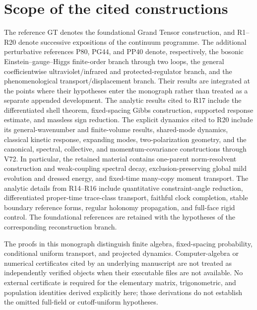\documentclass[11pt,a4paper,oneside]{book}
\theoremstyle{plain}
\theoremstyle{definition}
\theoremstyle{remark}
\begin{document}
\section{Scope of the cited constructions}
The reference GT denotes the foundational Grand Tensor construction, and
R1--R20 denote successive expositions of the continuum programme.  The
additional perturbative references P80, PG44, and PP40 denote, respectively,
the bosonic Einstein--gauge--Higgs finite-order branch through two loops, the
general coefficientwise ultraviolet/infrared and protected-regulator branch,
and the phenomenological transport/displacement branch.  Their results are
integrated at the points where their hypotheses enter the monograph rather
than treated as a separate appended development.  The
analytic results cited to R17 include the differentiated shell theorem,
fixed-spacing Gibbs construction, supported response estimate, and
massless sign reduction.  The explicit dynamics cited to R20 include its
general-wavenumber and finite-volume results, shared-mode dynamics,
classical kinetic response, expanding modes, two-polarization geometry,
and the canonical, spectral, collective, and momentum-covariance
constructions through V72.  In particular, the retained material
contains one-parent norm-resolvent construction and weak-coupling
spectral decay, exclusion-preserving global mild evolution and dressed
energy, and fixed-time many-copy moment transport.  The analytic details
from R14--R16 include quantitative constraint-angle reduction,
differentiated proper-time trace-class transport, faithful clock
completion, stable boundary reference forms, regular holonomy
propagation, and full-face rigid control.  The foundational references are
retained with the hypotheses of the corresponding reconstruction branch.

The proofs in this monograph distinguish finite algebra, fixed-spacing
probability, conditional uniform transport, and projected dynamics.
Computer-algebra or numerical certificates cited by an underlying
manuscript are not treated as independently verified objects when their
executable files are not available.  No external certificate is required
for the elementary matrix, trigonometric, and population identities
derived explicitly here; those derivations do not establish the omitted
full-field or cutoff-uniform hypotheses.
\end{document}
